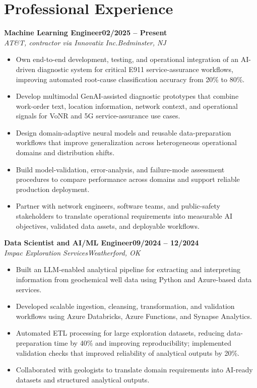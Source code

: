 \documentclass[9pt,letterpaper]{extarticle}
\newcommand{\role}[4]{\Needspace{4\baselineskip}\textbf{#1}\hfill\textbf{#2}\\[-1pt]\textit{#3}\hfill\textit{#4}\par}
\begin{document}
\section{Professional Experience}
\role{Machine Learning Engineer}{02/2025 -- Present}{AT\&T, contractor via Innovatix Inc.}{Bedminster, NJ}
\begin{itemize}
\item Own end-to-end development, testing, and operational integration of an AI-driven diagnostic system for critical E911 service-assurance workflows, improving automated root-cause classification accuracy from 20\% to 80\%.
\item Develop multimodal GenAI-assisted diagnostic prototypes that combine work-order text, location information, network context, and operational signals for VoNR and 5G service-assurance use cases.
\item Design domain-adaptive neural models and reusable data-preparation workflows that improve generalization across heterogeneous operational domains and distribution shifts.
\item Build model-validation, error-analysis, and failure-mode assessment procedures to compare performance across domains and support reliable production deployment.
\item Partner with network engineers, software teams, and public-safety stakeholders to translate operational requirements into measurable AI objectives, validated data assets, and deployable workflows.
\end{itemize}

\role{Data Scientist and AI/ML Engineer}{09/2024 -- 12/2024}{Impac Exploration Services}{Weatherford, OK}
\begin{itemize}
\item Built an LLM-enabled analytical pipeline for extracting and interpreting information from geochemical well data using Python and Azure-based data services.
\item Developed scalable ingestion, cleansing, transformation, and validation workflows using Azure Databricks, Azure Functions, and Synapse Analytics.
\item Automated ETL processing for large exploration datasets, reducing data-preparation time by 40\% and improving reproducibility; implemented validation checks that improved reliability of analytical outputs by 20\%.
\item Collaborated with geologists to translate domain requirements into AI-ready datasets and structured analytical outputs.
\end{itemize}
\end{document}
